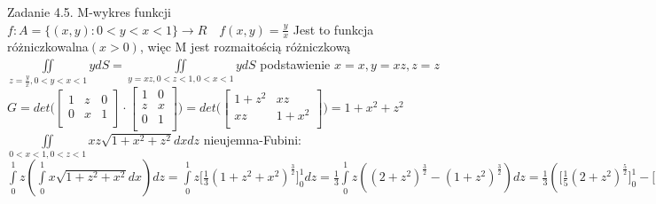 \documentclass{article}
\begin{document}
Zadanie 4.5.
\newline
\newline
M-wykres funkcji $f:A=\{(x,y):0<y<x<1\}\rightarrow R\quad f(x,y)=\frac{y}{x}$\newline
Jest to funkcja różniczkowalna$(x>0)$, więc M jest rozmaitością różniczkową\newline
$
\iint\limits_{z=\frac{y}{x},0<y<x<1}ydS
=
\iint\limits_{y=xz,0<z<1,0<x<1}ydS
$
podstawienie $x=x, y=xz, z=z$\newline
$
G=det\bigl(
\left[\begin{array}{ccc}
1&z&0\\
0&x&1\\
\end{array}\right]
\cdot
\left[\begin{array}{cc}
1&0\\
z&x\\
0&1\\
\end{array}\right]
\bigr)
=
det\bigl(
\left[\begin{array}{cc}
1+z^2&xz\\
xz&1+x^2\\
\end{array}\right]
\bigr)
=
1+x^2+z^2
$\newline
$
\iint\limits_{0<x<1,0<z<1}xz\sqrt{1+x^2+z^2}dxdz
$
nieujemna-Fubini:
$
\int\limits_{0}^{1}z(\int\limits_{0}^{1}x\sqrt{1+z^2+x^2}dx)dz
=
\int\limits_{0}^{1}z\bigl[\frac{1}{3}(1+z^2+x^2)^\frac{3}{2}\bigr]_{0}^{1}dz
=
\frac{1}{3}\int\limits_{0}^{1}z((2+z^2)^\frac{3}{2}-(1+z^2)^\frac{3}{2})dz
=
\frac{1}{3}(\bigl[\frac{1}{5}(2+z^2)^\frac{5}{2}\bigr]_{0}^{1}-\bigl[\frac{1}{5}(1+z^2)^\frac{5}{2}\bigr]_{0}^{1})
=
\frac{1}{15}(3^\frac{5}{2}-2^\frac{5}{2}-2^\frac{5}{2}+1^\frac{5}{2})
=
\frac{1}{15}(9\sqrt{3}-8\sqrt{2}+1)
$
\end{document}
